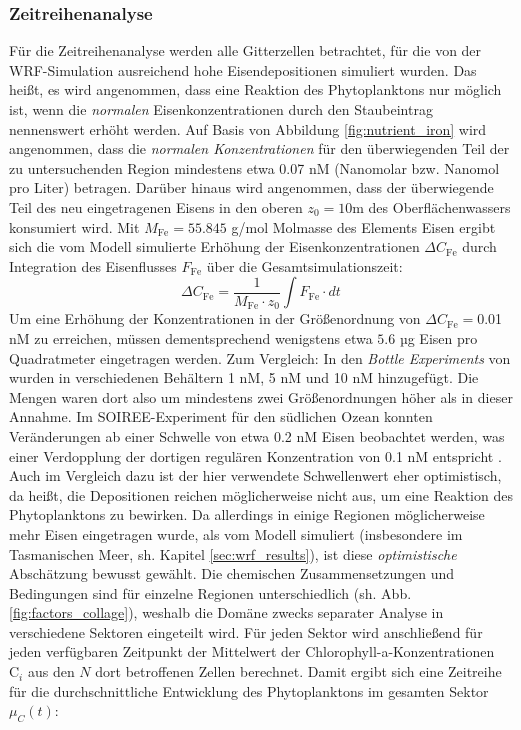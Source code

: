 \documentclass[12pt,a4paper,onecolumn,headheight=30pt]{scrartcl}
\begin{document}
\subsubsection{Zeitreihenanalyse} \label{sec:timeseries}
Für die Zeitreihenanalyse werden alle Gitterzellen betrachtet, für die von der WRF-Simulation ausreichend hohe Eisendepositionen simuliert wurden. Das heißt, es wird angenommen, dass eine Reaktion des Phytoplanktons nur möglich ist, wenn die \textit{normalen} Eisenkonzentrationen durch den Staubeintrag nennenswert erhöht werden. Auf Basis von Abbildung \ref{fig:nutrient_iron} wird angenommen, dass die \textit{normalen Konzentrationen} für den überwiegenden Teil der zu untersuchenden Region mindestens etwa 0.07 nM (Nanomolar bzw. Nanomol pro Liter) betragen. Darüber hinaus wird angenommen, dass der überwiegende Teil des neu eingetragenen Eisens in den oberen $z_0 = 10$m des Oberflächenwassers konsumiert wird. Mit  $M_{\text{Fe}} =  55.845$ g/mol Molmasse des Elements Eisen ergibt sich die vom Modell simulierte Erhöhung der Eisenkonzentrationen $\Delta C_\text{Fe}$ durch Integration des Eisenflusses $F_\text{Fe}$ über die Gesamtsimulationszeit:
\begin{equation}
\Delta C_\text{Fe} = \frac{1}{M_\text{Fe} \cdot z_0} \int F_\text{Fe} \cdot dt
\end{equation}
Um eine Erhöhung der Konzentrationen in der Größenordnung von $\Delta C_\text{Fe}=$0.01 nM zu erreichen, müssen dementsprechend wenigstens etwa $5.6$ µg Eisen pro Quadratmeter eingetragen werden. Zum Vergleich: In den \textit{Bottle Experiments} von \citet{Martin.1988} wurden in verschiedenen Behältern 1 nM, 5 nM und 10 nM hinzugefügt. Die Mengen waren dort also um mindestens zwei Größenordnungen höher als in dieser Annahme. Im SOIREE-Experiment für den südlichen Ozean \citep{Trull.2001} konnten Veränderungen ab einer Schwelle von etwa 0.2 nM Eisen beobachtet werden, was einer Verdopplung der dortigen regulären Konzentration von 0.1 nM entspricht \citep{Boyd.2010}. Auch im Vergleich dazu ist der hier verwendete Schwellenwert eher optimistisch, da heißt, die Depositionen reichen möglicherweise nicht aus, um eine Reaktion des Phytoplanktons zu bewirken. Da allerdings in einige Regionen möglicherweise mehr Eisen eingetragen wurde, als vom Modell simuliert (insbesondere im Tasmanischen Meer, sh. Kapitel \ref{sec:wrf_results}), ist diese \textit{optimistische} Abschätzung bewusst gewählt. Die  chemischen Zusammensetzungen und Bedingungen sind für einzelne Regionen unterschiedlich (sh. Abb. \ref{fig:factors_collage}), weshalb die Domäne zwecks separater Analyse in verschiedene Sektoren eingeteilt wird. Für jeden Sektor wird anschließend für jeden verfügbaren Zeitpunkt der Mittelwert der Chlorophyll-a-Konzentrationen $\text{C}_i$ aus den $N$ dort betroffenen Zellen berechnet. Damit ergibt sich eine Zeitreihe für die durchschnittliche Entwicklung des Phytoplanktons im gesamten Sektor $\mu_C(t)$:
\end{document}
